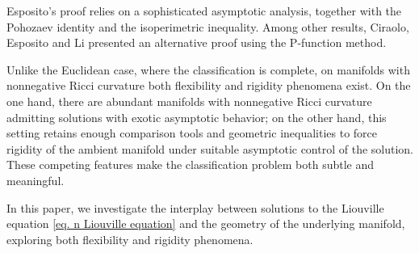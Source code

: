 \documentclass[12pt]{amsart}
\theoremstyle{plain}
\theoremstyle{definition}
\theoremstyle{remark}     %
\begin{document}
 
 Esposito's proof relies on a sophisticated asymptotic analysis, together with the Pohozaev identity and the isoperimetric inequality.
 Among other results,
 Ciraolo, Esposito and Li  \cite[Theorem 1.2]{CEL26}  presented  an alternative proof using the P-function method.

 Unlike the Euclidean case, where the classification is complete, on manifolds with nonnegative Ricci curvature both flexibility and rigidity phenomena exist. On the one hand, there are abundant manifolds with nonnegative Ricci curvature admitting solutions with exotic asymptotic behavior;
 on the other hand, this setting retains enough comparison tools and geometric inequalities to force rigidity of the  ambient manifold under suitable asymptotic control of the solution. These competing features make the classification problem both subtle and meaningful.


 In this paper, we investigate the interplay between solutions to the Liouville equation \cref{eq. n Liouville equation} and the geometry of the underlying manifold, exploring both  flexibility and rigidity phenomena.
\end{document}

